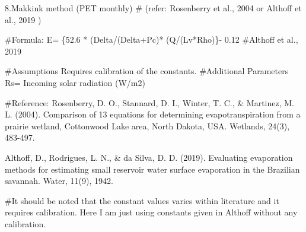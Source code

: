 \documentclass[
]{article}
\newenvironment{Shaded}{\begin{snugshade}}{\end{snugshade}}
\newcommand{\CommentTok}[1]{\textcolor[rgb]{0.56,0.35,0.01}{\textit{#1}}}
\newcommand{\DecValTok}[1]{\textcolor[rgb]{0.00,0.00,0.81}{#1}}
\newcommand{\FloatTok}[1]{\textcolor[rgb]{0.00,0.00,0.81}{#1}}
\newcommand{\NormalTok}[1]{#1}
\newcommand{\OtherTok}[1]{\textcolor[rgb]{0.56,0.35,0.01}{#1}}
\newcommand{\SpecialCharTok}[1]{\textcolor[rgb]{0.00,0.00,0.00}{#1}}
\begin{document}
8.Makkink method (PET monthly) \# (refer: Rosenberry et al., 2004 or
Althoff et al., 2019 )

\#Formula: E= \{52.6 * (Delta/(Delta+Pc)* (Q/(Lv*Rho)\}- 0.12 \#Althoff
et al., 2019

\#Assumptions Requires calibration of the constants. \#Additional
Parameters Rs= Incoming solar radiation (W/m2)

\#Reference: Rosenberry, D. O., Stannard, D. I., Winter, T. C., \&
Martinez, M. L. (2004). Comparison of 13 equations for determining
evapotranspiration from a prairie wetland, Cottonwood Lake area, North
Dakota, USA. Wetlands, 24(3), 483-497.

Althoff, D., Rodrigues, L. N., \& da Silva, D. D. (2019). Evaluating
evaporation methods for estimating small reservoir water surface
evaporation in the Brazilian savannah. Water, 11(9), 1942.

\#It should be noted that the constant values varies within literature
and it requires calibration. Here I am just using constants given in
Althoff without any calibration.

\begin{Shaded}
\end{Shaded}
\end{document}
